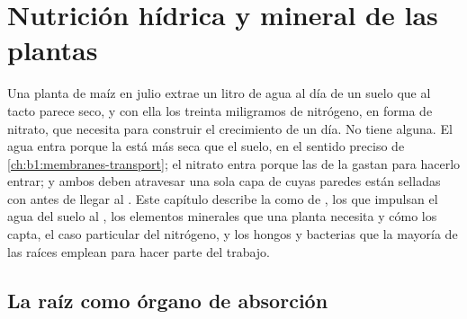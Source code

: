 \chapter{Nutrición hídrica y mineral de las plantas}\label{ch:b1:plant-water-minerals}

Una planta de maíz en julio extrae un litro de agua al día de un suelo que
al tacto parece seco, y con ella los treinta miligramos de nitrógeno, en
forma de nitrato, que necesita para construir el crecimiento de un día. No
tiene  alguna. El agua entra porque la  está más seca que el suelo,
en el sentido preciso de \cref{ch:b1:membranes-transport}; el nitrato entra
porque las  de la  gastan  para hacerlo entrar; y ambos deben
atravesar una sola capa de  cuyas paredes están selladas con 
antes de llegar al . Este capítulo describe la  como  de
, los  que impulsan el agua del suelo al
, los elementos minerales que una planta necesita y cómo los capta, el
caso particular del nitrógeno, y los hongos y bacterias que la mayoría de
las raíces emplean para hacer parte del trabajo.

\section{La raíz como órgano de absorción}

